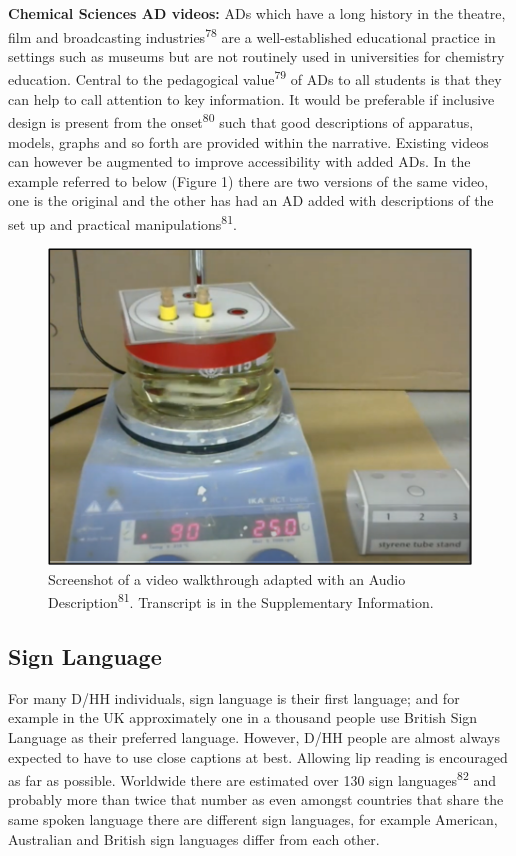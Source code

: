 \documentclass[11.5pt]{sig-alternate} %
\begin{document}
\begin{large}
\textbf{Chemical Sciences AD videos:} ADs which have a long history in the theatre, film and broadcasting industries\textsuperscript{78} are a well-established educational practice in settings such as museums but are not routinely used in universities for chemistry education.  Central to the pedagogical value\textsuperscript{79} of ADs to all students is that they can help to call attention to key information. It would be preferable if inclusive design is present from the onset\textsuperscript{80} such that good descriptions of apparatus, models, graphs and so forth are provided within the narrative. Existing videos can however be augmented to improve accessibility with added ADs. In the example referred to below (Figure 1) there are two versions of the same video, one is the original and the other has had an AD added with descriptions of the set up and practical manipulations\textsuperscript{81}. 

\begin{figure}[htb]
    \centering
    \includegraphics[width=\columnwidth]{images/fig1.png}
    \caption{Screenshot of a video walkthrough adapted with an Audio Description\textsuperscript{81}. Transcript is in the Supplementary Information.}
    \label{Figure 1}
\end{figure}

\subsection*{Sign Language}
For many D/HH individuals, sign language is their first language; and for example in the UK approximately one in a thousand people use British Sign Language as their preferred language. However, D/HH people are almost always expected to have to use close captions at best. Allowing lip reading is encouraged as far as possible. Worldwide there are estimated over 130 sign languages\textsuperscript{82} and probably more than twice that number as even amongst countries that share the same spoken language there are different sign languages, for example American, Australian and British sign languages differ from each other.


\end{large}
\end{document}
